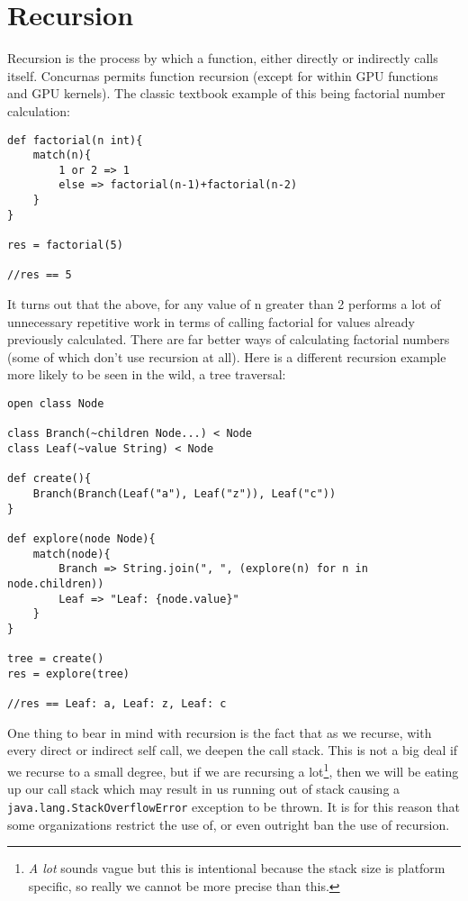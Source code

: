 \documentclass[conc-doc]{subfiles}
\begin{document}
\section{Recursion}
Recursion is the process by which a function, either directly or indirectly calls itself. Concurnas permits function recursion (except for within GPU functions and GPU kernels). The classic textbook example of this being factorial number calculation:

\begin{lstlisting}
def factorial(n int){
	match(n){
		1 or 2 => 1
		else => factorial(n-1)+factorial(n-2)
	}
}

res = factorial(5)

//res == 5
\end{lstlisting}

It turns out that the above, for any value of n greater than 2 performs a lot of unnecessary repetitive work in terms of calling factorial for values already previously calculated. There are far better ways of calculating factorial numbers (some of which don't use recursion at all). Here is a different recursion example more likely to be seen in the wild, a tree traversal:

\begin{lstlisting}
open class Node

class Branch(~children Node...) < Node
class Leaf(~value String) < Node

def create(){
	Branch(Branch(Leaf("a"), Leaf("z")), Leaf("c"))
}

def explore(node Node){
	match(node){
		Branch => String.join(", ", (explore(n) for n in node.children))
		Leaf => "Leaf: {node.value}"
	}
}

tree = create()
res = explore(tree)

//res == Leaf: a, Leaf: z, Leaf: c
\end{lstlisting}

One thing to bear in mind with recursion is the fact that as we recurse, with every direct or indirect self call, we deepen the call stack. This is not a big deal if we recurse to a small degree, but if we are recursing a lot\footnote{\textit{A lot} sounds vague but this is intentional because the stack size is platform specific, so really we cannot be more precise than this.}, then we will be eating up our call stack which may result in us running out of stack causing a \lstinline{java.lang.StackOverflowError} exception to be thrown. It is for this reason that some organizations restrict the use of, or even outright ban the use of recursion.
\end{document}
